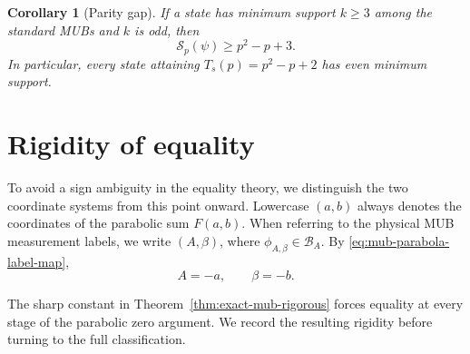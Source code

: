 \documentclass[11pt]{article}
\newtheorem{corollary}[theorem]{Corollary}
\begin{document}
\begin{corollary}[Parity gap]
\label{cor:parity-gap-rigorous}
If a state has minimum support \(k\ge3\) among the standard MUBs and
\(k\) is odd, then
\[
 \mathcal S_p(\psi)\ge p^2-p+3.
\]
In particular, every state attaining
\(T_s(p)=p^2-p+2\) has even minimum support.
\end{corollary}


\section{Rigidity of equality}
\label{sec:extremizer-structure}

To avoid a sign ambiguity in the equality theory, we distinguish the two
coordinate systems from this point onward.  Lowercase \((a,b)\) always denotes
the coordinates of the parabolic sum \(F(a,b)\).  When referring to the
physical MUB measurement labels, we write \((A,\beta)\), where
\(\phi_{A,\beta}\in\mathcal B_A\).  By
\eqref{eq:mub-parabola-label-map},
\begin{equation}
 A=-a,\qquad \beta=-b.
 \label{eq:F-to-physical-labels}
\end{equation}

The sharp constant in Theorem~\ref{thm:exact-mub-rigorous} forces equality
at every stage of the parabolic zero argument.  We record the resulting
rigidity before turning to the full classification.
\end{document}
